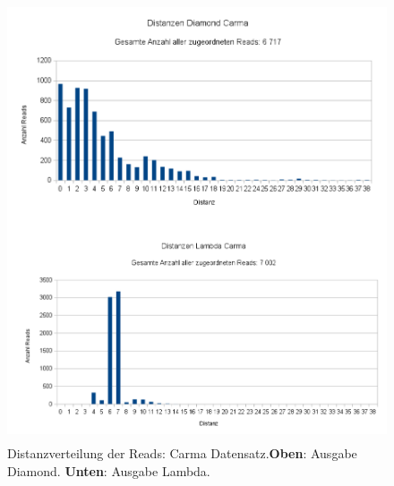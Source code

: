 \documentclass[10pt, a4paper]{article}[08.12.2015]
\begin{document}
    \begin{figure}[H]
      \centering
      \noindent\includegraphics[width=\linewidth,height=13cm,
      keepaspectratio]{Abbildungen/Carma_Distanzen_both.png}
      \caption[Distanzverteilung der Reads: Carma Datensatz.]{\small{Distanzverteilung der Reads: Carma Datensatz.\newline \textbf{Oben}: Ausgabe Diamond. \textbf{Unten}: Ausgabe Lambda.}}
      \centering     
    \end{figure}
\end{document}
